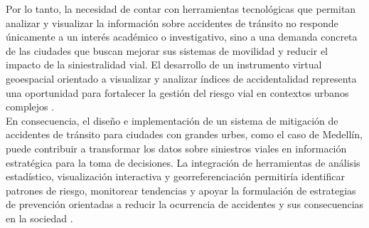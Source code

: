 Por lo tanto, la necesidad de contar con herramientas tecnológicas que permitan analizar y visualizar la información sobre accidentes de tránsito no responde únicamente a un interés académico o investigativo, sino a una demanda concreta de las ciudades que buscan mejorar sus sistemas de movilidad y reducir el impacto de la siniestralidad vial. El desarrollo de un instrumento virtual geoespacial orientado a visualizar y analizar índices de accidentalidad representa una oportunidad para fortalecer la gestión del riesgo vial en contextos urbanos complejos  \cite{parraga2024}.\\
En consecuencia, el diseño e implementación de un sistema de mitigación de accidentes de tránsito para ciudades con grandes urbes, como el caso de Medellín, puede contribuir a transformar los datos sobre siniestros viales en información estratégica para la toma de decisiones. La integración de herramientas de análisis estadístico, visualización interactiva y georreferenciación permitiría identificar patrones de riesgo, monitorear tendencias y apoyar la formulación de estrategias de prevención orientadas a reducir la ocurrencia de accidentes y sus consecuencias en la sociedad \cite{figueroa2022}.\\
